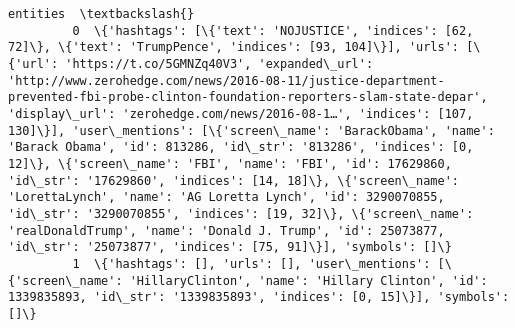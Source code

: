 \documentclass[11pt]{article}
\begin{document}
\begin{Verbatim}[commandchars=\\\{\}]
                                                                                                                                                                                                                                                                                                                                                                                                                                                                                                                                                                                                                                                                                                                                                                                                                                                                                          entities  \textbackslash{}
         0  \{'hashtags': [\{'text': 'NOJUSTICE', 'indices': [62, 72]\}, \{'text': 'TrumpPence', 'indices': [93, 104]\}], 'urls': [\{'url': 'https://t.co/5GMNZq40V3', 'expanded\_url': 'http://www.zerohedge.com/news/2016-08-11/justice-department-prevented-fbi-probe-clinton-foundation-reporters-slam-state-depar', 'display\_url': 'zerohedge.com/news/2016-08-1…', 'indices': [107, 130]\}], 'user\_mentions': [\{'screen\_name': 'BarackObama', 'name': 'Barack Obama', 'id': 813286, 'id\_str': '813286', 'indices': [0, 12]\}, \{'screen\_name': 'FBI', 'name': 'FBI', 'id': 17629860, 'id\_str': '17629860', 'indices': [14, 18]\}, \{'screen\_name': 'LorettaLynch', 'name': 'AG Loretta Lynch', 'id': 3290070855, 'id\_str': '3290070855', 'indices': [19, 32]\}, \{'screen\_name': 'realDonaldTrump', 'name': 'Donald J. Trump', 'id': 25073877, 'id\_str': '25073877', 'indices': [75, 91]\}], 'symbols': []\}   
         1  \{'hashtags': [], 'urls': [], 'user\_mentions': [\{'screen\_name': 'HillaryClinton', 'name': 'Hillary Clinton', 'id': 1339835893, 'id\_str': '1339835893', 'indices': [0, 15]\}], 'symbols': []\}                                                                                                                                                                                                                                                                                                                                                                                                                                                                                                                                                                                                                                                                                               

\end{Verbatim}
\end{document}
